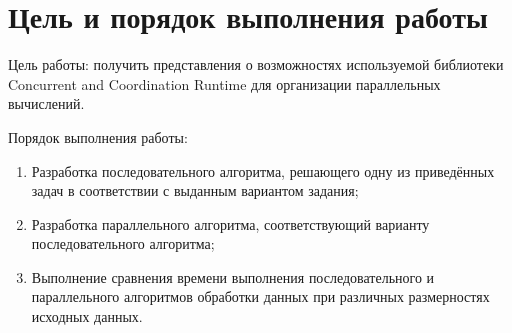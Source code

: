 \documentclass[russian,utf8,pointsection]{eskdtext}
\begin{document}
	\maketitle
	\tableofcontents
	\newpage
	
	\section{Цель и порядок выполнения работы}
		  Цель работы: получить представления о возможностях используемой библиотеки Concurrent and Coordination Runtime для организации параллельных вычислений.
	
	Порядок выполнения работы:
	\begin{enumerate}
		\item Разработка последовательного алгоритма, решающего одну из приведённых задач в соответствии с выданным вариантом задания;
		\item Разработка параллельного алгоритма, соответствующий варианту последовательного алгоритма;
		\item Выполнение сравнения времени выполнения последовательного и параллельного алгоритмов обработки данных при различных размерностях исходных данных.
	\end{enumerate}
	\newpage 
	
	
	
\end{document}

